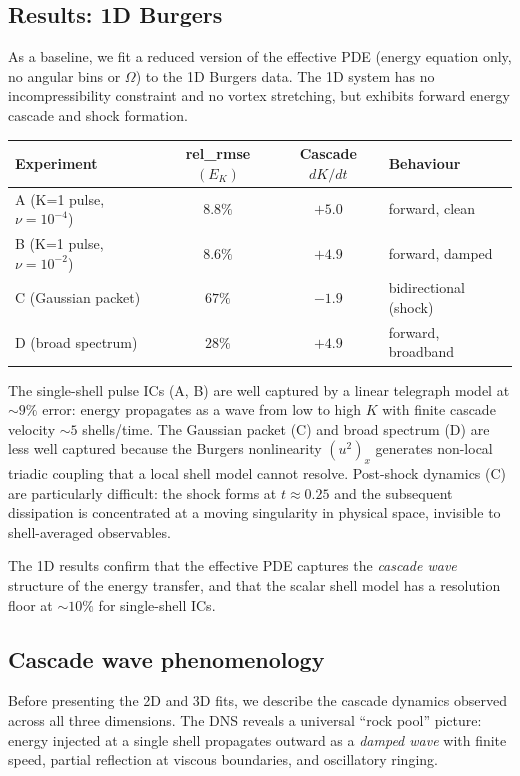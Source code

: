 \documentclass[11pt,a4paper]{article}
\theoremstyle{remark}
\begin{document}
\subsection{Results: 1D Burgers}\label{sec:results-1d}

As a baseline, we fit a reduced version of the effective PDE (energy equation only, no angular bins or $\Omega$) to the 1D Burgers data.  The 1D system has no incompressibility constraint and no vortex stretching, but exhibits forward energy cascade and shock formation.

\begin{center}
\begin{tabular}{lccl}
\toprule
Experiment & rel\_rmse$(E_K)$ & Cascade $dK/dt$ & Behaviour \\
\midrule
A (K=1 pulse, $\nu=10^{-4}$) & $8.8\%$  & $+5.0$ & forward, clean \\
B (K=1 pulse, $\nu=10^{-2}$) & $8.6\%$  & $+4.9$ & forward, damped \\
C (Gaussian packet)           & $67\%$   & $-1.9$ & bidirectional (shock) \\
D (broad spectrum)            & $28\%$   & $+4.9$ & forward, broadband \\
\bottomrule
\end{tabular}
\end{center}

The single-shell pulse ICs (A, B) are well captured by a linear telegraph model at $\sim 9\%$ error: energy propagates as a wave from low to high $K$ with finite cascade velocity $\sim 5$ shells/time.  The Gaussian packet (C) and broad spectrum (D) are less well captured because the Burgers nonlinearity $(u^2)_x$ generates non-local triadic coupling that a local shell model cannot resolve.  Post-shock dynamics (C) are particularly difficult: the shock forms at $t \approx 0.25$ and the subsequent dissipation is concentrated at a moving singularity in physical space, invisible to shell-averaged observables.

The 1D results confirm that the effective PDE captures the \emph{cascade wave} structure of the energy transfer, and that the scalar shell model has a resolution floor at $\sim 10\%$ for single-shell ICs.

\subsection{Cascade wave phenomenology}\label{sec:cascade-waves}

Before presenting the 2D and 3D fits, we describe the cascade dynamics observed across all three dimensions.  The DNS reveals a universal ``rock pool'' picture: energy injected at a single shell propagates outward as a \emph{damped wave} with finite speed, partial reflection at viscous boundaries, and oscillatory ringing.
\end{document}
